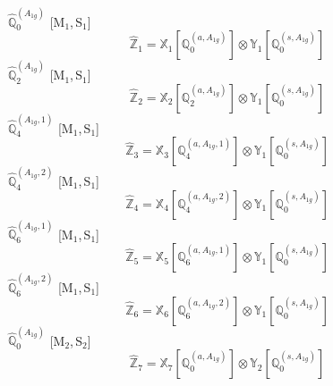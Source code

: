 \documentclass[fleqn,10pt,landscape]{article}
\begin{document}
\begin{itemize}
\vspace{4mm}
\noindent {} $\,\,\,\hat{\mathbb{Q}}_{0}^{(A_{1g})}$ [M$_{1}$,\,S$_{1}$]
\begin{dmath*}
\hat{\mathbb{Z}}_{1}=\mathbb{X}_{1}[\mathbb{Q}_{0}^{(a,A_{1g})}] \otimes\mathbb{Y}_{1}[\mathbb{Q}_{0}^{(s,A_{1g})}]
\end{dmath*}
\vspace{4mm}
\noindent {} $\,\,\,\hat{\mathbb{Q}}_{2}^{(A_{1g})}$ [M$_{1}$,\,S$_{1}$]
\begin{dmath*}
\hat{\mathbb{Z}}_{2}=\mathbb{X}_{2}[\mathbb{Q}_{2}^{(a,A_{1g})}] \otimes\mathbb{Y}_{1}[\mathbb{Q}_{0}^{(s,A_{1g})}]
\end{dmath*}
\vspace{4mm}
\noindent {} $\,\,\,\hat{\mathbb{Q}}_{4}^{(A_{1g},1)}$ [M$_{1}$,\,S$_{1}$]
\begin{dmath*}
\hat{\mathbb{Z}}_{3}=\mathbb{X}_{3}[\mathbb{Q}_{4}^{(a,A_{1g},1)}] \otimes\mathbb{Y}_{1}[\mathbb{Q}_{0}^{(s,A_{1g})}]
\end{dmath*}
\vspace{4mm}
\noindent {} $\,\,\,\hat{\mathbb{Q}}_{4}^{(A_{1g},2)}$ [M$_{1}$,\,S$_{1}$]
\begin{dmath*}
\hat{\mathbb{Z}}_{4}=\mathbb{X}_{4}[\mathbb{Q}_{4}^{(a,A_{1g},2)}] \otimes\mathbb{Y}_{1}[\mathbb{Q}_{0}^{(s,A_{1g})}]
\end{dmath*}
\vspace{4mm}
\noindent {} $\,\,\,\hat{\mathbb{Q}}_{6}^{(A_{1g},1)}$ [M$_{1}$,\,S$_{1}$]
\begin{dmath*}
\hat{\mathbb{Z}}_{5}=\mathbb{X}_{5}[\mathbb{Q}_{6}^{(a,A_{1g},1)}] \otimes\mathbb{Y}_{1}[\mathbb{Q}_{0}^{(s,A_{1g})}]
\end{dmath*}
\vspace{4mm}
\noindent {} $\,\,\,\hat{\mathbb{Q}}_{6}^{(A_{1g},2)}$ [M$_{1}$,\,S$_{1}$]
\begin{dmath*}
\hat{\mathbb{Z}}_{6}=\mathbb{X}_{6}[\mathbb{Q}_{6}^{(a,A_{1g},2)}] \otimes\mathbb{Y}_{1}[\mathbb{Q}_{0}^{(s,A_{1g})}]
\end{dmath*}
\vspace{4mm}
\noindent {} $\,\,\,\hat{\mathbb{Q}}_{0}^{(A_{1g})}$ [M$_{2}$,\,S$_{2}$]
\begin{dmath*}
\hat{\mathbb{Z}}_{7}=\mathbb{X}_{7}[\mathbb{Q}_{0}^{(a,A_{1g})}] \otimes\mathbb{Y}_{2}[\mathbb{Q}_{0}^{(s,A_{1g})}]
\end{dmath*}
\vspace{4mm}

\end{itemize}
\end{document}
